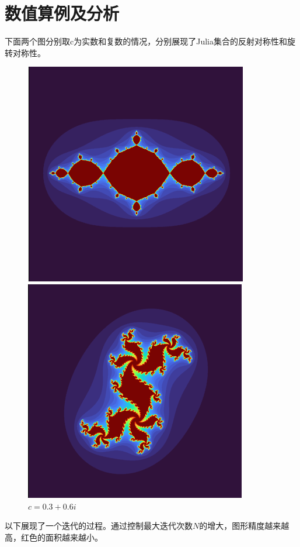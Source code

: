 \documentclass{ctexart}
\begin{document}
\section{数值算例及分析}
下面两个图分别取c为实数和复数的情况，分别展现了Julia集合的反射对称性和旋转对称性。
\begin{figure}[h]
	\centering
	\begin{minipage}{0.4\linewidth}
		\centering
		\includegraphics[width=0.55\linewidth]{-1.png}
		\caption{$c=-1$}%
		\label{chutian1}%
	\end{minipage}
	\begin{minipage}{0.4\linewidth}
		\centering
		\includegraphics[width=0.55\linewidth]{0.3_0.6.png}
		\caption{$c=0.3+0.6i$}
		\label{chutian2}%
	\end{minipage}
\end{figure}

以下展现了一个迭代的过程。通过控制最大迭代次数$N$的增大，图形精度越来越高，红色的面积越来越小。
\end{document}
